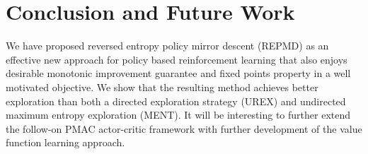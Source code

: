 
\section{Conclusion and Future Work}
\label{sec:conclusion_and_future_work}

We have proposed reversed entropy policy mirror descent (REPMD)
as an effective new approach for policy based reinforcement learning
that also enjoys desirable monotonic improvement guarantee and fixed points property in a well motivated objective.
We show that the resulting method achieves better exploration than both
a directed exploration strategy (UREX) and undirected maximum entropy
exploration (MENT). 
It will be interesting to further extend the follow-on
PMAC actor-critic framework
with further development of the value function learning approach.
